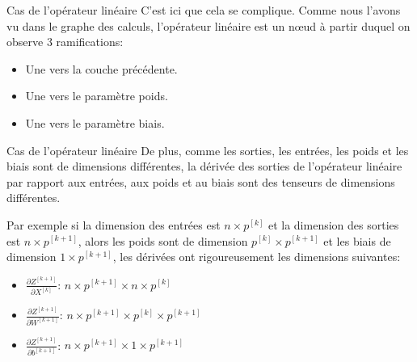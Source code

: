 \begin{frame}{Cas de l'opérateur linéaire}
	C'est ici que cela se complique. Comme nous l'avons vu dans le graphe des calculs, l'opérateur linéaire est un nœud à partir duquel on observe 3 ramifications:
	
	\begin{itemize}
		\item Une vers la couche précédente.
		\item Une vers le paramètre poids.
		\item Une vers le paramètre biais.
	\end{itemize}
\end{frame}

\begin{frame}{Cas de l'opérateur linéaire}
	De plus, comme les sorties, les entrées, les poids et les biais sont de dimensions différentes, la dérivée des sorties de l'opérateur linéaire par rapport aux entrées, aux poids et au biais sont des tenseurs de dimensions différentes.
	
	\vspace{0.3cm}
	\pause
	
	Par exemple si la dimension des entrées est $n \times p^{[k]}$ et la dimension des sorties est $n \times p^{[k+1]}$, alors les poids sont de dimension $p^{[k]} \times p^{[k+1]}$ et les biais de dimension $1 \times p^{[k+1]}$, les dérivées ont rigoureusement les dimensions suivantes:
	
	\begin{itemize}
		\item $\frac{\partial{Z^{[k+1]}}}{\partial{X^{[k]}}}$: $n \times p^{[k+1]} \times n \times p^{[k]}$
		\item $\frac{\partial{Z^{[k+1]}}}{\partial{W^{[k+1]}}}$: $n \times p^{[k+1]} \times p^{[k]} \times p^{[k+1]}$
		\item $\frac{\partial{Z^{[k+1]}}}{\partial{b^{[k+1]}}}$: $n \times p^{[k+1]} \times 1 \times p^{[k+1]}$
	\end{itemize}
\end{frame}

